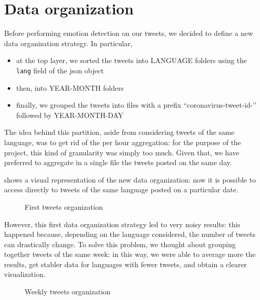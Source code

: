 \section{Data organization}
\label{sub:data-org}

Before performing emotion detection on our tweets, we decided to define a new data organization strategy. In particular,

\begin{itemize}
	\item at the top layer, we sorted the tweets into LANGUAGE folders using the \texttt{lang} field of the json object
	\item then, into YEAR-MONTH folders
	\item finally, we grouped the tweets into files with a prefix “coronavirus-tweet-id-” followed by YEAR-MONTH-DAY
\end{itemize}

The idea behind this partition, aside from considering tweets of the same language, was to get rid of the per hour aggregation: for the purpose of the project, this kind of granularity was simply too much. Given that, we have preferred to aggregate in a single file the tweets posted on the same day.

 shows a visual representation of the new data organization: now it is possible to access directly to tweets of the same language posted on a particular date.

\begin{figure}[H]
	\caption{First tweets organization}
	\label{fig:tweet-org-1}
\end{figure}

However, this first data organization strategy led to very noisy results: this happened because, depending on the language considered, the number of tweets can drastically change. To solve this problem, we thought about grouping together tweets of the same week: in this way, we were able to average more the results, get stabler data for languages with fewer tweets, and obtain a clearer visualization.

\begin{figure}[H]
	\caption{Weekly tweets organization}
	\label{fig:tweet-org-2}
\end{figure}

